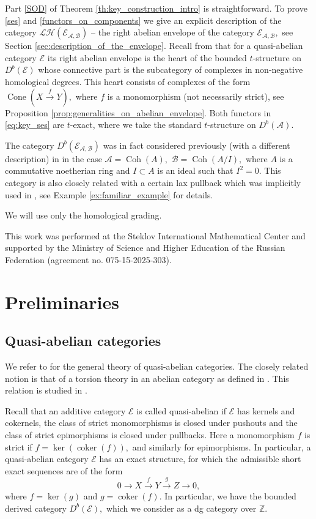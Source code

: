 \documentclass[11pt,leqno]{amsart}
\numberwithin{equation}{section}
\def\Z{\mathbb{Z}}
\newcommand{\xto}{\xrightarrow}
\newcommand{\Coh}{\operatorname{Coh}}
\newcommand{\Cone}{\operatorname{Cone}}
\newcommand{\cL}{{\mathcal L}}
\newcommand{\cA}{{\mathcal A}}
\newcommand{\cB}{{\mathcal B}}
\newcommand{\cE}{{\mathcal E}}
\newcommand{\cH}{{\mathcal H}}
\newcommand{\coker}{\operatorname{coker}}
\begin{document}
Part \ref{SOD} of Theorem \ref{th:key_construction_intro} is straightforward. To prove \ref{ses} and \ref{functors_on_components} we give an explicit description of the category $\cL\cH(\cE_{\cA,\cB})$ -- the right abelian envelope of the category $\cE_{\cA,\cB},$ see Section \ref{sec:description_of_the_envelope}. Recall from \cite{Sch99} that for a quasi-abelian category $\cE$ its right abelian envelope is the heart of the bounded $t$-structure on $D^b(\cE)$ whose connective part is the subcategory of complexes in non-negative homological degrees. This heart consists of complexes of the form $\Cone(X\xto{f} Y),$ where $f$ is a monomorphism (not necessarily strict), see Proposition \ref{prop:generalities_on_abelian_envelope}. Both functors in \eqref{eq:key_ses} are $t$-exact, where we take the standard $t$-structure on $D^b(\cA).$

The category $D^b(\cE_{\cA,\cB})$ was in fact considered previously (with a different description) in \cite{KL15, E20} in the case $\cA=\Coh(A),$ $\cB=\Coh(A/I),$ where $A$ is a commutative noetherian ring and $I\subset A$ is an ideal such that $I^2=0.$ This category is also closely related with a certain lax pullback which was implicitly used in \cite[Proofs of Theorem 2.25 and Corollary 3.5]{LT19}, see Example \ref{ex:familiar_example} for details.

{} We will use only the homological grading.

{} This work was performed at the Steklov International Mathematical Center
and supported by the Ministry of Science and Higher Education of the
Russian Federation (agreement no. 075-15-2025-303). 

\section{Preliminaries}

\subsection{Quasi-abelian categories}
\label{ssec:quasi_abelian}

We refer to \cite{Sch99} for the general theory of quasi-abelian categories. The closely related notion is that of a torsion theory in an abelian category as defined in \cite{HRS96}. This relation is studied in \cite[Section 5.4 and Appendix B]{BVdB03}. 

Recall that an additive category $\cE$ is called quasi-abelian if $\cE$ has kernels and cokernels, the class of strict monomorphisms is closed under pushouts and the class of strict epimorphisms is closed under pullbacks. Here a monomorphism $f$ is strict if $f=\ker(\coker(f)),$ and similarly for epimorphisms. In particular, a quasi-abelian category $\cE$ has an exact structure, for which the admissible short exact sequences are of the form
\begin{equation}\label{eq:adm_ses}
0\to X\xto{f} Y\xto{g} Z\to 0,
\end{equation}
where $f=\ker(g)$ and $g=\coker(f).$ In particular, we have the bounded derived category $D^b(\cE),$ which we consider as a dg category over $\Z.$
\end{document}
